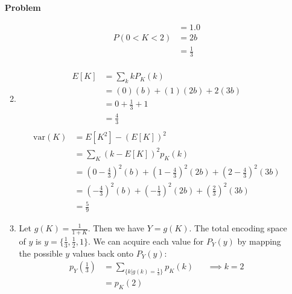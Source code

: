 \documentclass[12pt]{article}
\newenvironment{Ex}{\textbf{Problem}\vspace{.75em}\\}{}
\begin{document}
\begin{enumerate}
\begin{Ex}
\begin{solution}
\begin{enumerate}
\begin{equation}
\begin{aligned}
              &= 1.0 \\
              P(0<K<2) &= 2b \\
              &= \frac{1}{3} \\
            \end{aligned}
          \end{equation}
        \item 
          \begin{equation}
            \label{eq:1c-expected-sol}
            \begin{aligned}
              E[K] &= \sum_k k P_K(k) \\
              &= (0)(b) + (1)(2b) + 2(3b) \\
              &= 0 + \frac{1}{3} + 1 \\
              &= \frac{4}{3} \\
            \end{aligned}
          \end{equation}
          \begin{equation}
            \label{eq:1c-variance-sol}
            \begin{aligned}
              \text{var}(K) &= E[K^2] - (E[K])^2 \\
              &= \sum_K(k-E[K])^2p_K(k) \\
              &= \left(0 - \frac{4}{3}\right)^2(b) +
              \left(1 - \frac{4}{3}\right)^2(2b) +
              \left(2 - \frac{4}{3}\right)^2(3b) \\
              &= \left(-\frac{4}{3}\right)^2(b) +
              \left(-\frac{1}{3}\right)^2(2b) +
              \left(\frac{2}{3}\right)^2(3b) \\
              &= \frac{5}{9}
            \end{aligned}
          \end{equation}
        \item Let $g(K) = \frac{1}{1+K}$. Then we have $Y=g(K)$. The
          total encoding space of $y$ is $y = \{\frac{1}{3},
          \frac{1}{2}, 1\}$. We can acquire each value for $P_Y(y)$ by
          mapping the possible $y$ values back onto $P_Y(y)$:
          \begin{equation}
            \label{eq:1d-pmf}
            \begin{aligned}
              p_Y\left(\frac{1}{3}\right) &= \sum_{\{k | g(k) =
                \frac{1}{3}\}}p_K(k) && \implies k = 2 \\
              &= p_K(2) \\

\end{aligned}
\end{equation}
\end{enumerate}
\end{solution}
\end{Ex}
\end{enumerate}
\end{document}
